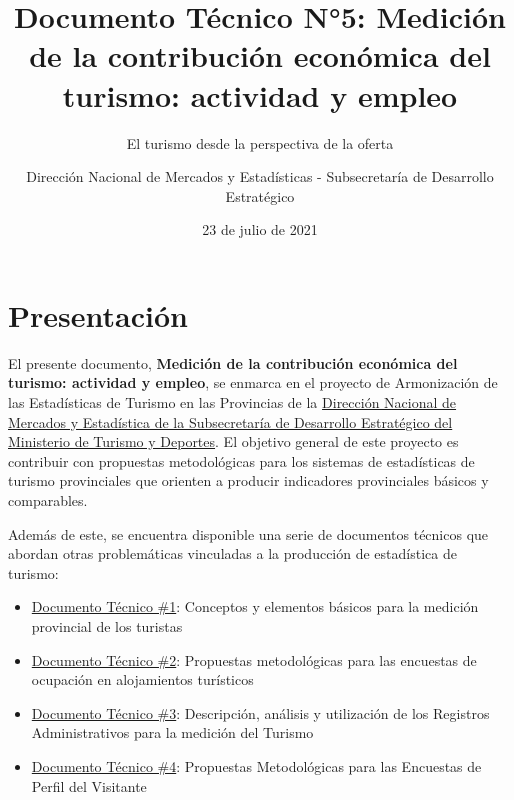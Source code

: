 \documentclass[
  openany]{book}
\title{Documento Técnico N°5: Medición de la contribución económica del turismo: actividad y empleo}
\subtitle{El turismo desde la perspectiva de la oferta}
\author{Dirección Nacional de Mercados y Estadísticas - Subsecretaría de Desarrollo Estratégico}
\date{23 de julio de 2021}
\let\oldmaketitle\maketitle
\begin{document}
\maketitle


\newpage

\let\maketitle\oldmaketitle
\maketitle

{
\setcounter{tocdepth}{1}
\tableofcontents
}
\hypertarget{presentaciuxf3n}{%
\chapter*{Presentación}\label{presentaciuxf3n}}

El presente documento, \textbf{Medición de la contribución económica del turismo: actividad y empleo}, se enmarca en el proyecto de Armonización de las Estadísticas de Turismo en las Provincias de la \href{http://datos.yvera.gob.ar/}{Dirección Nacional de Mercados y Estadística de la Subsecretaría de Desarrollo Estratégico del Ministerio de Turismo y Deportes}. El objetivo general de este proyecto es contribuir con propuestas metodológicas para los sistemas de estadísticas de turismo provinciales que orienten a producir indicadores provinciales básicos y comparables.

Además de este, se encuentra disponible una serie de documentos técnicos que abordan otras problemáticas vinculadas a la producción de estadística de turismo:

\begin{itemize}
\item
  \href{https://dnme-minturdep.github.io/DT1_medicion_turismo/}{Documento Técnico \#1}: Conceptos y elementos básicos para la medición provincial de los turistas
\item
  \href{https://dnme-minturdep.github.io/DT2_encuestas/}{Documento Técnico \#2}: Propuestas metodológicas para las encuestas de ocupación en alojamientos turísticos
\item
  \href{https://dnme-minturdep.github.io/DT3_registros_adminsitrativos/}{Documento Técnico \#3}: Descripción, análisis y utilización de los Registros Administrativos para la medición del Turismo
\item
  \href{https://dnme-minturdep.github.io/DT4_perfiles/}{Documento Técnico \#4}: Propuestas Metodológicas para las Encuestas de Perfil del Visitante
\end{itemize}
\end{document}
